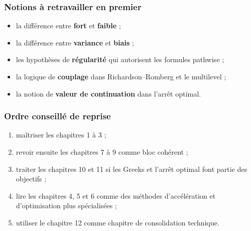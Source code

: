 \documentclass[11pt,a4paper]{article}
\begin{document}
\subsubsection*{Notions à retravailler en premier}

\begin{itemize}
  \item la différence entre \textbf{fort} et \textbf{faible} ;
  \item la différence entre \textbf{variance} et \textbf{biais} ;
  \item les hypothèses de \textbf{régularité} qui autorisent les formules pathwise ;
  \item la logique de \textbf{couplage} dans Richardson--Romberg et le multilevel ;
  \item la notion de \textbf{valeur de continuation} dans l'arrêt optimal.
\end{itemize}

\subsubsection*{Ordre conseillé de reprise}

\begin{enumerate}
  \item maîtriser les chapitres 1 à 3 ;
  \item revoir ensuite les chapitres 7 à 9 comme bloc cohérent ;
  \item traiter les chapitres 10 et 11 si les Greeks et l'arrêt optimal font partie des objectifs ;
  \item lire les chapitres 4, 5 et 6 comme des méthodes d'accélération et d'optimisation plus spécialisées ;
  \item utiliser le chapitre 12 comme chapitre de consolidation technique.
\end{enumerate}
\end{document}
